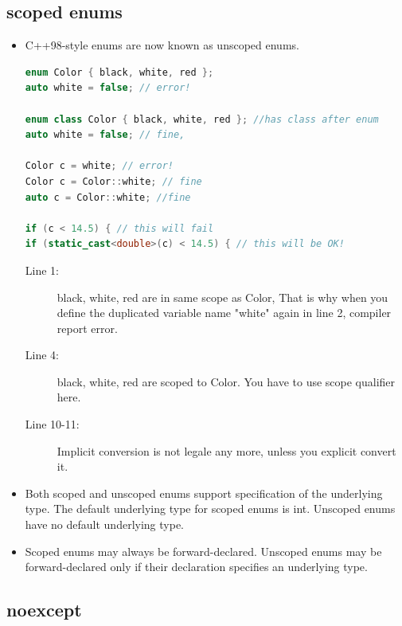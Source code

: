 \documentclass[a4paper,11pt,twoside]{book}
\begin{document}
\subsection{scoped enums}
\begin{itemize}
\item C++98-style enums are now known as unscoped enums.
\begin{lstlisting}[frame=single, language=c++]
enum Color { black, white, red };
auto white = false; // error! 

enum class Color { black, white, red }; //has class after enum
auto white = false; // fine, 

Color c = white; // error!
Color c = Color::white; // fine
auto c = Color::white; //fine

if (c < 14.5) { // this will fail 
if (static_cast<double>(c) < 14.5) { // this will be OK! 
\end{lstlisting}
\begin{description}
	\item[Line 1:] black, white, red are in same scope as Color, That is why when you define the duplicated variable name "white" again in line 2, compiler report error.
	\item[Line 4:]black, white, red are scoped to Color. You have to use scope qualifier here.
    \item[Line 10-11:] Implicit conversion is not legale any more, unless you explicit convert it.
\end{description}

\item Both scoped and unscoped enums support specification of the underlying type.  The default underlying type for scoped enums is int. Unscoped enums have no default underlying type.

\item Scoped enums may always be forward-declared. Unscoped enums may be forward-declared only if their declaration specifies an underlying type.

\end{itemize}

\subsection{noexcept}
\end{document}
